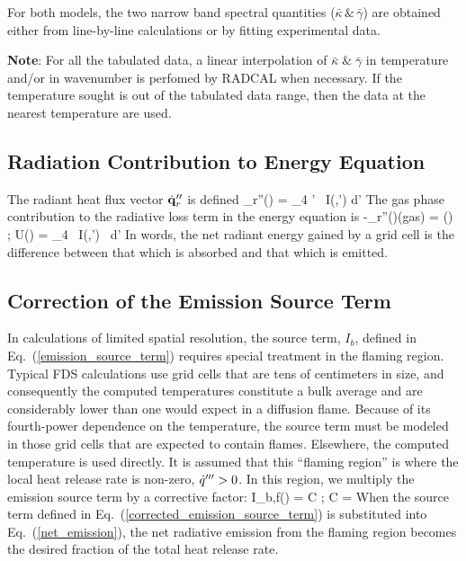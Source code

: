   For both models, the two narrow band spectral quantities ($\bar{\kappa} \,\&\, \bar{\gamma}$)
  are obtained either from line-by-line calculations or by fitting experimental data.

  \textbf{Note}: For all the tabulated data, a linear interpolation of $\bar{\kappa} \;\&\; \bar{\gamma}$ 
  in temperature and/or in wavenumber is perfomed by RADCAL when necessary. 
  If the temperature sought is out of the tabulated data range, 
  then the data at the nearest temperature are used.

\subsection{Radiation Contribution to Energy Equation}

The radiant heat flux vector $\dot{\bf q}_r''$ is defined
\be \dbq_r''(\bx) = \int_{4\pi} \; \bs' \, I(\bx,\bs') \; d\bs'   \ee
The gas phase contribution to the radiative loss term in the energy equation is
\be -\nabla\!\cdot \dbq_r''(\bx)(\mbox{gas}) =
    \kappa(\bx) \, \left[ U(\bx) - 4 \pi \, I_b(\bx) \right]  \quad ; \quad
    U(\bx) = \int_{4\pi} \, I(\bx,\bs') \, d\bs'  \label{net_emission}
\ee
In words, the net radiant energy gained by a grid cell is the
difference between that which is absorbed and that which is emitted.

\subsection{Correction of the Emission Source Term}

In calculations of limited spatial resolution, the source term, $I_b$,
defined in Eq.~(\ref{emission_source_term}) requires special treatment in the flaming region. Typical FDS calculations
use grid cells that are tens of centimeters in size, and consequently the computed temperatures constitute a bulk average and are considerably lower than
one would expect in a diffusion flame.
Because of its fourth-power dependence on the temperature,
the source term must be modeled in those grid cells that are expected to contain flames. Elsewhere, the computed temperature is used directly.
It is assumed that this ``flaming region'' is where the local heat release rate is non-zero, $\dot{q}'''>0$. In this region, we
multiply the emission source term by a corrective factor:
\be I_{b,f}(\bx) = C    \quad ; \quad
    C =  \label{corrected_emission_source_term}
\ee
When the source term defined in Eq.~(\ref{corrected_emission_source_term}) is
substituted into Eq.~(\ref{net_emission}), the net radiative emission from the flaming region becomes the desired fraction of the total heat release rate.

